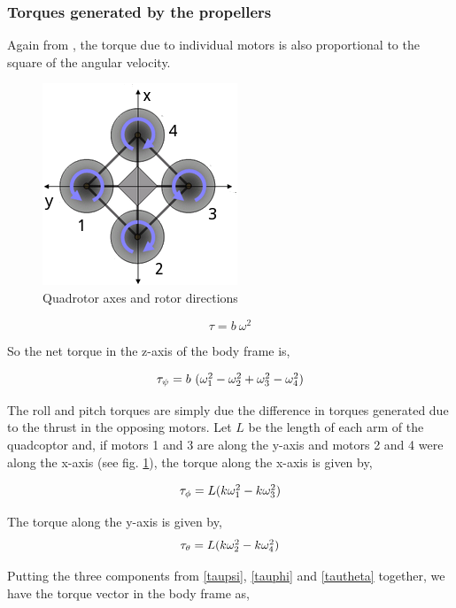 \documentclass[12pt,fleqn]{article}
\begin{document}
\subsubsection{Torques generated by the propellers}

Again from \cite{Andrew}, the torque due to individual motors is also
proportional to the square of the angular velocity.

\begin{figure}
\centering
\includegraphics[scale=0.8]{quadrotor.png}
\caption{Quadrotor axes and rotor directions}
\label{quadrotor}
\end{figure}

$$ \tau = b\ \omega^2 $$

So the net torque in the z-axis of the body frame is,

\begin{equation} \label{taupsi}
$$ \tau_\psi = b\ (\omega_1^2 - \omega_2^2 + \omega_3^2 -
\omega_4^2) $$
\end{equation}

The roll and pitch torques are simply due the difference in torques
generated due to the thrust in the opposing motors. Let $L$ be the
length of each arm of the quadcoptor and, if motors 1 and 3 are along
the y-axis and motors 2 and 4 were along the x-axis (see fig. \ref{quadrotor}), the torque along
the x-axis is given by,

\begin{equation} \label{tauphi}
$$ \tau_\phi = L (k\omega_1^2 - k\omega_3^2) $$
\end{equation}

The torque along the y-axis is given by,
\begin{equation} \label{tautheta}
$$ \tau_\theta = L (k\omega_2^2 - k\omega_4^2) $$
\end{equation}

Putting the three components from \ref{taupsi}, \ref{tauphi} and
\ref{tautheta} together, we have the torque vector in the body frame as,
\end{document}
